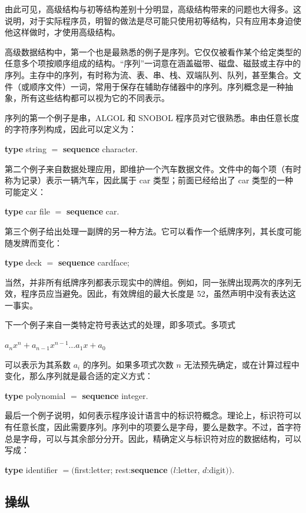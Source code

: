 \documentclass[twoside,11pt,fontset=none]{ctexbook}
\begin{document}
由此可见，高级结构与初等结构差别十分明显，高级结构带来的问题也大得多。这说明，对于实际程序员，明智的做法是尽可能只使用初等结构，只有应用本身迫使他这样做时，才使用高级结构。

高级数据结构中，第一个也是最熟悉的例子是序列。它仅仅被看作某个给定类型的任意多个项按顺序组成的结构。“序列”一词意在涵盖磁带、磁盘、磁鼓或主存中的序列。主存中的序列，有时称为流、表、串、栈、双端队列、队列，甚至集合。文件（或顺序文件）一词，常用于保存在辅助存储器中的序列。序列概念是一种抽象，所有这些结构都可以视为它的不同表示。

序列的第一个例子是串，ALGOL 和 SNOBOL 程序员对它很熟悉。串由任意长度的字符序列构成，因此可以定义为：

\quad \textbf{type} string $=$ \textbf{sequence} character.

第二个例子来自数据处理应用，即维护一个汽车数据文件。文件中的每个项（有时称为记录）表示一辆汽车，因此属于 car 类型；前面已经给出了 car 类型的一种可能定义：

\quad \textbf{type} car file $=$ \textbf{sequence} car.

第三个例子给出处理一副牌的另一种方法。它可以看作一个纸牌序列，其长度可能随发牌而变化：

\quad \textbf{type} deck $=$ \textbf{sequence} cardface;

\noindent
当然，并非所有纸牌序列都表示现实中的牌组。例如，同一张牌出现两次的序列无效，程序员应当避免。因此，有效牌组的最大长度是 52，虽然声明中没有表达这一事实。

下一个例子来自一类特定符号表达式的处理，即多项式。多项式

$a_n x^n + a_{n-1}x^{n-1}\dots a_1 x + a_0$

\noindent
可以表示为其系数 $a_i$ 的序列。如果多项式次数 $n$ 无法预先确定，或在计算过程中变化，那么序列就是最合适的定义方式：

\quad \textbf{type} polynomial $=$ \textbf{sequence} integer.

最后一个例子说明，如何表示程序设计语言中的标识符概念。理论上，标识符可以有任意长度，因此需要序列。序列中的项要么是字母，要么是数字。不过，首字符总是字母，可以与其余部分分开。因此，精确定义与标识符对应的数据结构，可以写成：

\quad \textbf{type} identifier $= ($first:letter; rest:\textbf{sequence} $(l$:letter, $d$:digit$))$.

\subsection{操纵}
\end{document}
